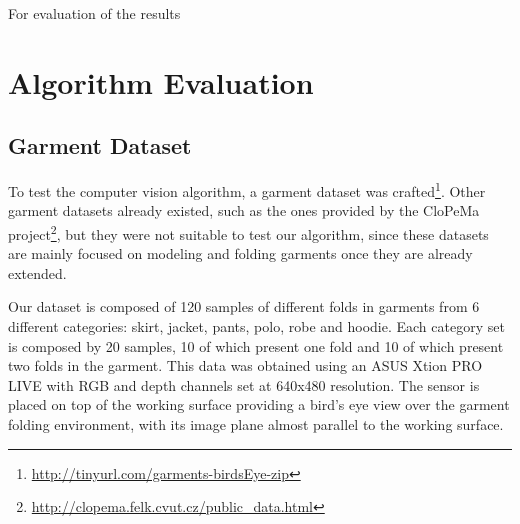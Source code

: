 For evaluation of the results 

\section{Algorithm Evaluation}
\label{experiments:evaluation}


\subsection{Garment Dataset}
\label{experiments:dataset}

To test the computer vision algorithm, a garment dataset was crafted\footnote{\url{http://tinyurl.com/garments-birdsEye-zip}}. Other garment datasets already existed, such as the ones provided by the CloPeMa project\footnote{\url{http://clopema.felk.cvut.cz/public_data.html}}, but they were not suitable to test our algorithm, since these datasets are mainly focused on modeling and folding garments once they are already extended. 

Our dataset is composed of 120 samples of different folds in garments from 6 different categories: skirt, jacket, pants, polo, robe and hoodie. Each category set is composed by 20 samples, 10 of which present one fold and 10 of which present two folds in the garment. This data was obtained using an ASUS Xtion PRO LIVE with RGB and depth channels set at 640x480 resolution. The sensor is placed on top of the working surface providing a bird's eye view over the garment folding environment, with its image plane almost parallel to the working surface.

